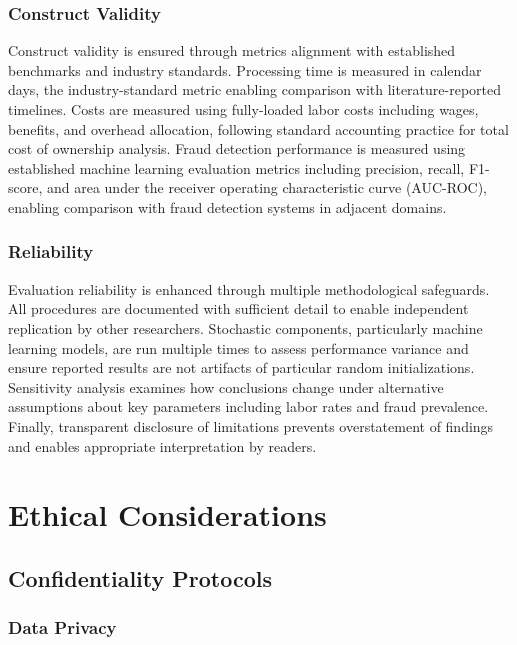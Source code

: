 \subsubsection{Construct Validity}

Construct validity is ensured through metrics alignment with established benchmarks and industry standards. Processing time is measured in calendar days, the industry-standard metric enabling comparison with literature-reported timelines. Costs are measured using fully-loaded labor costs including wages, benefits, and overhead allocation, following standard accounting practice for total cost of ownership analysis. Fraud detection performance is measured using established machine learning evaluation metrics including precision, recall, F1-score, and area under the receiver operating characteristic curve (AUC-ROC), enabling comparison with fraud detection systems in adjacent domains.

\subsubsection{Reliability}

Evaluation reliability is enhanced through multiple methodological safeguards. All procedures are documented with sufficient detail to enable independent replication by other researchers. Stochastic components, particularly machine learning models, are run multiple times to assess performance variance and ensure reported results are not artifacts of particular random initializations. Sensitivity analysis examines how conclusions change under alternative assumptions about key parameters including labor rates and fraud prevalence. Finally, transparent disclosure of limitations prevents overstatement of findings and enables appropriate interpretation by readers.

\section{Ethical Considerations}\label{sec:ethics}

\subsection{Confidentiality Protocols}

\subsubsection{Data Privacy}

